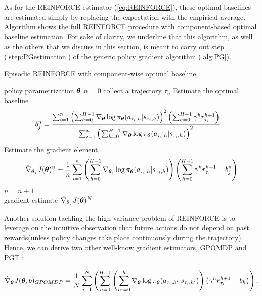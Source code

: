 As for the REINFORCE estimator (\ref{eq:REINFORCE}), these optimal baselines are estimated simply by replacing the expectation with the empirical average. Algorithm \label{alg:REINFORCE} shows the full REINFORCE procedure with component-based optimal baseline estimation. For sake of clarity, we underline that this algorithm, as well as the others that we discuss in this section, is meant to carry out step (\ref{step:PGestimation}) of the generic policy gradient algorithm (\ref{alg:PG}).
\begin{algorithm}[t]
	\caption{Episodic REINFORCE with component-wise optimal baseline.}
	\label{alg:REINFORCE}
	\begin{algorithmic}[1]
	 policy parametrization $\boldsymbol{\theta}$
	 $n=0$
		\State collect a trajectory $\tau_n$
			\State Estimate the optimal baseline 
			\begin{align*}
			b_{j}^{n} &= \frac{\sum_{i=1}^{n}\left(\sum_{h=0}^{H-1}\nabla_{\boldsymbol{\theta}}\log\pi_{\boldsymbol{\theta}}(a_{\tau_i,h}|s_{\tau_i,h})\right)^2\left(\sum_{h=0}^{H-1}\gamma^h r^{h+1}_{\tau_i}\right)}{\sum_{i=1}^{n}\left(\sum_{h=0}^{H-1}\nabla_{\boldsymbol{\theta}}\log\pi_{\boldsymbol{\theta}}(a_{\tau_i,h}|s_{\tau_i,h})\right)^2}
			\end{align*}
			\State Estimate the gradient element
			\begin{align*}
\hat{\nabla}_{\boldsymbol{\theta}_j}J(\boldsymbol{\theta})^{n}= \frac{1}{n}\sum_{i=1}^{n}\left(\sum_{h=0}^{H-1}\nabla_{\boldsymbol{\theta}_j}\log\pi_{\boldsymbol{\theta}}(a_{\tau_i,h}|s_{\tau_i,h}) \right)\left(\sum_{h=0}^{H-1}\gamma^h r^{h+1}_{\tau_i} - b_j^n \right)
\end{align*}
		\EndFor
		\State $n=n+1$
	\EndWhile \\
	\Return gradient estimate $\hat{\nabla}_{\boldsymbol{\theta}_j}J(\boldsymbol{\theta})^{N}$
	\end{algorithmic}
\end{algorithm}

Another solution tackling the high-variance problem of REINFORCE is to leverage on the intuitive observation that future actions do not depend on past rewards(unless policy changes take place continuously during the trajectory). Hence, we can derive two other well-know gradient estimators, \gls{GPOMDP} \cite{baxter2001infinite} and PGT \cite{sutton2000policy}:

\begin{align}
\hat{\nabla}_{\boldsymbol{\theta}}J(\boldsymbol{\theta}, b)_{GPOMDP} = \frac{1}{N}\sum_{i=1}^{N}\left(\sum_{h=0}^{H-1}\left(\sum_{h'=0}^{h}\nabla_{\boldsymbol{\theta}}\log\pi_{\boldsymbol{\theta}}(a_{\tau_i,h'}|s_{\tau_i,h'})\right)\left(\gamma^h r^{h+1}_{\tau_i} - b_h \right)\right),
\end{align}

